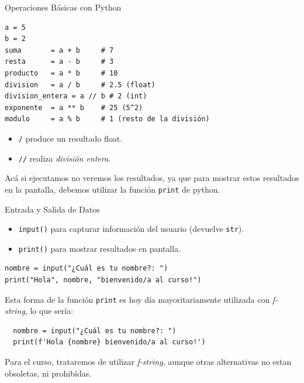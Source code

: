 \documentclass[10pt]{beamer}
\begin{document}
\begin{frame}[fragile]{Operaciones Básicas con Python}

\begin{verbatim}
a = 5
b = 2
suma       = a + b     # 7
resta      = a - b     # 3
producto   = a * b     # 10
division   = a / b     # 2.5 (float)
division_entera = a // b # 2 (int)
exponente  = a ** b    # 25 (5^2)
modulo     = a % b     # 1 (resto de la división)
\end{verbatim}

\begin{itemize}
  \item \texttt{/} produce un resultado float.
  \item \texttt{//} realiza \emph{división entera}.
\end{itemize}

Acá si ejecutamos no veremos los resultados, ya que para mostrar estos resultados en la pantalla, debemos utilizar la función \texttt{print} de python.
\end{frame}

\begin{frame}[fragile]{Entrada y Salida de Datos}
\begin{itemize}
  \item \texttt{input()} para capturar información del usuario (devuelve \texttt{str}).
  \item \texttt{print()} para mostrar resultados en pantalla.
\end{itemize}
\begin{verbatim}
nombre = input("¿Cuál es tu nombre?: ")
print("Hola", nombre, "bienvenido/a al curso!")
\end{verbatim}

Esta forma de la función \texttt{print} es hoy día mayoritariamente utilizada con \textit{f-string}, lo que sería:

\begin{verbatim}
  nombre = input("¿Cuál es tu nombre?: ")
  print(f'Hola {nombre} bienvenido/a al curso!')
  \end{verbatim}

  Para el curso, trataremos de utilizar \textit{f-string}, aunque otras alternativas no estan obsoletas, ni prohibídas.
\end{frame}
\end{document}
